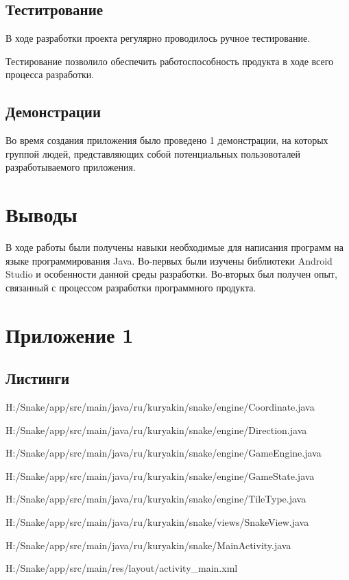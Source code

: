 	\subsection{Теститрование}
	
	В ходе разработки проекта регулярно проводилось ручное тестирование.
	
	Тестирование позволило обеспечить работоспособность продукта в ходе всего процесса разработки. 
	
	\subsection{Демонстрации}
	
	Во время создания приложения было проведено 1 демонстрации, на которых группой людей, представляющих собой потенциальных пользовоталей разработываемого приложения.
	
	\section{Выводы}
	
	В ходе работы были получены навыки необходимые для написания программ на языке программирования Java. Во-первых были изучены библиотеки Android Studio и особенности данной среды разработки. Во-вторых был получен опыт, связанный с процессом разработки программного продукта. 
	
	\section{Приложение 1}
	
	\subsection{Листинги}
	
	
	{H:/Snake/app/src/main/java/ru/kuryakin/snake/engine/Coordinate.java}
	
	
	{H:/Snake/app/src/main/java/ru/kuryakin/snake/engine/Direction.java}
	
	
	{H:/Snake/app/src/main/java/ru/kuryakin/snake/engine/GameEngine.java}
	
	
	{H:/Snake/app/src/main/java/ru/kuryakin/snake/engine/GameState.java}
	
	
	{H:/Snake/app/src/main/java/ru/kuryakin/snake/engine/TileType.java}
	
	
	{H:/Snake/app/src/main/java/ru/kuryakin/snake/views/SnakeView.java}
	
	
	{H:/Snake/app/src/main/java/ru/kuryakin/snake/MainActivity.java}
	
	
	{H:/Snake/app/src/main/res/layout/activity_main.xml}
	
